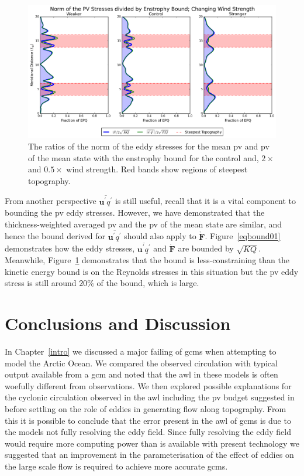 \documentclass[12pt,a4paper]{report}
\newcommand*\thkmean[1]{\overline{#1}}
\newcommand*\thkres[1]{{#1}^{\prime}}
\newcommand*\spec[1]{\mathring{#1}}
\newcommand*\figref[1]{Figure~\ref{#1}}
\begin{document}
   \begin{figure}
   	\centering
   	\includegraphics[width=\linewidth]{normoverepq_0_1}
   	\caption{ The ratios of the norm of the eddy stresses for the mean \gls{pv} and
   		\gls{pv} of the mean state with the enstrophy bound for
   		the control and, $2\times$ and  $0.5\times$ wind strength. Red bands show regions of steepest topography.}
   	\label{normoverepq01}
   \end{figure}
   
   From another perspective $\thkmean{\thkres{\boldsymbol{u}}\thkres{q}}$ is still useful,
   recall that it is a vital component to bounding the \gls{pv} eddy stresses.
   However, we have demonstrated that the thickness-weighted averaged 
   \gls{pv} and the \gls{pv} of the mean state are similar, and hence the bound 
   derived for  $\thkmean{\thkres{\boldsymbol{u}}\thkres{q}}$ should also apply to $\boldsymbol{\spec{F}}$. 
   \figref{eqbound01} demonstrates how the
   eddy stresses, $\thkmean{\thkres{\boldsymbol{u}}\thkres{q}}$ and $\boldsymbol{\spec{F}}$
   are bounded by $\sqrt{KQ}$. Meanwhile, \figref{normoverepq01} demonstrates that the bound
   is less-constraining than the kinetic energy bound is on the Reynolds stresses in this situation
    but the \gls{pv} eddy stress is still around
   $20\%$ of the bound, which is large.  
   

\chapter{Conclusions and Discussion}
\label{summary}

In Chapter~\ref{intro} we discussed a major failing of \glspl{gcm} when attempting to model
the Arctic Ocean. We compared the observed circulation with typical output available 
from a \gls{gcm} and noted that the \gls{awl} in these models is often woefully 
different from observations. We then explored possible explanations for the cyclonic 
circulation observed in the  \gls{awl} including the \gls{pv} budget suggested in
\cite{yang2005arctic} before settling on the role of eddies in generating flow along
topography. From this it is possible to conclude that the error present in the \gls{awl} of \glspl{gcm} is due to the models not fully resolving the eddy field. Since fully
resolving the eddy field would require more computing power than is available with 
present technology we suggested that an improvement in the parameterisation of the effect
of eddies on the large scale flow
is required to achieve more accurate \glspl{gcm}.
\end{document}
